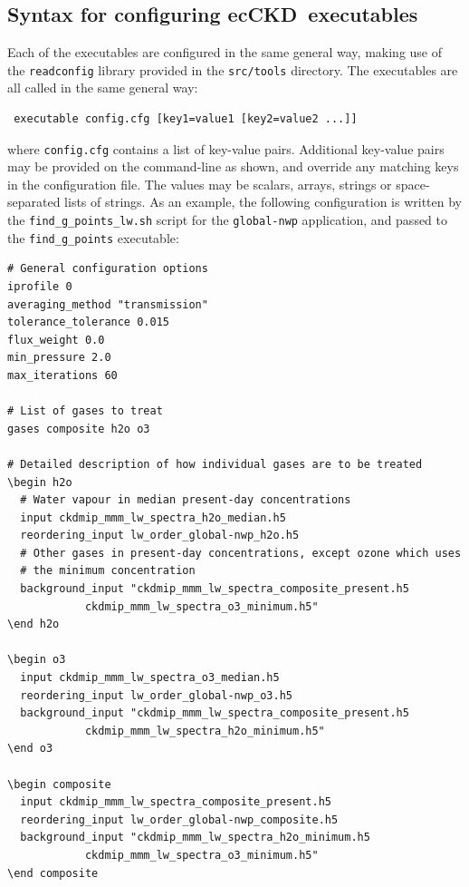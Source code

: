 \documentclass[a4,oneside]{article}
\def\codesize{\small}
\newcommand{\ecckd}{ecCKD}
\def\codesize{\small}
\def\code#1{{\codesize\texttt{#1}}}
\begin{document}
\subsection{Syntax for configuring \ecckd\ executables}
\label{sec:executables}
Each of the executables are configured in the same general way, making
use of the \code{readconfig} library provided in the \code{src/tools}
directory. The executables are all called in the same general way:
\begin{lstlisting}
 executable config.cfg [key1=value1 [key2=value2 ...]]
\end{lstlisting}
where \code{config.cfg} contains a list of key-value pairs. Additional
key-value pairs may be provided on the command-line as shown, and
override any matching keys in the configuration file. The values may
be scalars, arrays, strings or space-separated lists of strings. As an
example, the following configuration is written by the
\code{find\_g\_points\_lw.sh} script for the \code{global-nwp}
application, and passed to the \code{find\_g\_points} executable:
%
\begin{lstlisting}
# General configuration options
iprofile 0
averaging_method "transmission"
tolerance_tolerance 0.015
flux_weight 0.0
min_pressure 2.0
max_iterations 60

# List of gases to treat
gases composite h2o o3

# Detailed description of how individual gases are to be treated
\begin h2o
  # Water vapour in median present-day concentrations
  input ckdmip_mmm_lw_spectra_h2o_median.h5
  reordering_input lw_order_global-nwp_h2o.h5
  # Other gases in present-day concentrations, except ozone which uses
  # the minimum concentration
  background_input "ckdmip_mmm_lw_spectra_composite_present.h5
            ckdmip_mmm_lw_spectra_o3_minimum.h5"
\end h2o

\begin o3
  input ckdmip_mmm_lw_spectra_o3_median.h5
  reordering_input lw_order_global-nwp_o3.h5
  background_input "ckdmip_mmm_lw_spectra_composite_present.h5
            ckdmip_mmm_lw_spectra_h2o_minimum.h5"
\end o3

\begin composite
  input ckdmip_mmm_lw_spectra_composite_present.h5
  reordering_input lw_order_global-nwp_composite.h5
  background_input "ckdmip_mmm_lw_spectra_h2o_minimum.h5
            ckdmip_mmm_lw_spectra_o3_minimum.h5"
\end composite
\end{lstlisting}
\end{document}
